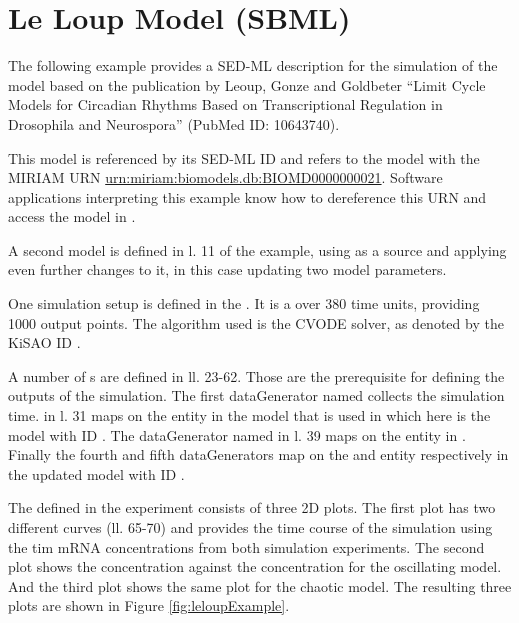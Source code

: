 \section{Le Loup Model (SBML)}
The following example provides a SED-ML description for the simulation of the model based on the publication by Leoup, Gonze and Goldbeter ``Limit Cycle Models for Circadian Rhythms Based on Transcriptional Regulation in Drosophila and Neurospora'' (PubMed ID: 10643740).

This model is referenced by its SED-ML ID   and refers to the model with the MIRIAM URN \url{urn:miriam:biomodels.db:BIOMD0000000021}. 
Software applications interpreting this example know how to dereference this URN and access the model in \biom \citep{N+06}.

A second model is defined in l. 11 of the example, using  as a source and applying even further changes to it, in this case updating two model parameters.

One simulation setup is defined in the . It is a  over 380 time units, providing 1000 output points. The algorithm used is the CVODE solver, as denoted by the KiSAO ID .

A number of s are defined in ll. 23-62. Those are the prerequisite for defining the outputs of the simulation. The first dataGenerator named  collects the simulation time.  in l. 31 maps on the  entity in the model that is used in  which here is the model with ID . The dataGenerator named  in l. 39 maps on the  entity in . Finally  the fourth and fifth dataGenerators map on the  and  entity respectively in the updated model with ID .

The  defined in the experiment consists of three 2D plots. The first plot has two different curves (ll. 65-70) and provides the time course of the simulation using the tim mRNA concentrations from both simulation experiments. The second plot shows the  concentration against the  concentration for the oscillating model. And the third plot shows the same plot for the chaotic model. The resulting three plots are shown in Figure \ref{fig:leloupExample}. 




